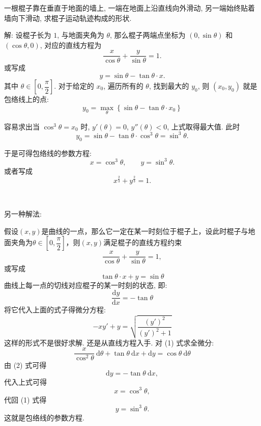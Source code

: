 \newpage

一根棍子靠在垂直于地面的墙上, 一端在地面上沿直线向外滑动, 另一端始终贴着墙向下滑动, 求棍子运动轨迹构成的形状.
\begin{figure*}[htbp]
\centering
{}
\end{figure*}

解: 设棍子长为 $1$, 与地面夹角为 $\theta$, 那么棍子两端点坐标为 $(0,\sin\theta)$ 和 $(\cos\theta,0)$, 对应的直线方程为 
\[ \frac{x}{\cos\theta} + \frac{y}{\sin\theta} = 1 .\]
或写成
\[y = \sin\theta - \tan\theta\cdot x .\]
其中 $\theta\in[0,\dfrac{\pi}{2}]$. 对于给定的 $x_0$, 遍历所有的 $\theta$, 找到最大的 $y_0$, 则 $(x_0, y_0)$ 就是包络线上的点:
\[y_0 = \mathop{\max}_{\theta}\left\{ \sin\theta - \tan\theta\cdot x_0 \right\}\]

容易求出当 $\cos^3\theta = x_0$ 时, $y'(\theta) = 0$, $y''(\theta) < 0$, 上式取得最大值. 此时 
\[ y_0 = \sin\theta - \tan\theta\cdot\cos^3\theta = \sin^3\theta.\]

于是可得包络线的参数方程:
\[ x = \cos^3\theta, \qquad y = \sin^3\theta .\]
或者写成
\[x^{\frac{2}{3}} + y^{\frac{2}{3}} = 1.\]

~

\noindent 另一种解法:

假设$(x,y)$是曲线的一点，那么它一定在某一时刻位于棍子上，设此时棍子与地面夹角为$\theta\in[0,\dfrac{\pi}{2}]$，则$(x,y)$满足棍子的直线方程约束
$$ \frac{x}{\cos\theta} + \frac{y}{\sin\theta} = 1 ,$$
或写成
\[ \tan\theta\cdot x + y = \sin\theta \tag{1} \]
曲线上每一点的切线对应棍子的某一时刻的状态, 即:
\[
\frac{\mathrm{d}y}{\mathrm{d}x}= -\tan\theta \tag{2}
\]
将它代入上面的式子得微分方程:
$$-x y' +y=\sqrt{\frac{(y')^2}{(y')^2+1}} $$
这样的形式不是很好求解. 还是从直线方程入手. 对 (1) 式求全微分:
$$  \frac{x}{\cos^2\theta}\ \mathrm{d}\theta + \tan\theta\ \mathrm{d}x + \mathrm{d}y  = \cos\theta\ \mathrm{d}\theta  $$
由 (2) 式可得 
$$ \mathrm{d}y = -\tan\theta\ \mathrm{d}x ,$$
代入上式可得
$$ x = \cos^3\theta ,$$
代回 (1) 式得
$$ y = \sin^3\theta .$$
这就是包络线的参数方程.

